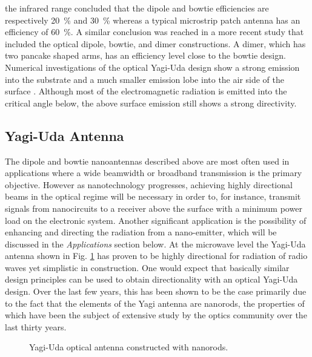 \documentclass[11pt]{article}
\begin{document}
the infrared range \cite{Fischer2008} concluded that the dipole and bowtie efficiencies are respectively \SI{20}{\percent} and \SI{30}{\percent} whereas a typical microstrip patch antenna has an efficiency of \SI{60}{\percent}. A similar conclusion was reached in a more recent study \cite{9781107014145} that included the optical dipole, bowtie, and dimer constructions. A dimer, which has two pancake shaped arms, has an efficiency level close to the bowtie design. Numerical investigations of the optical Yagi-Uda design show a strong emission into the substrate and a much smaller emission lobe into the air side of the surface \cite{Hofmann2007} \cite{Kosako2010}. Although most of the electromagnetic radiation is emitted into the critical angle below, the above surface emission still shows a strong directivity.
\subsection{Yagi-Uda Antenna}
%
The dipole and bowtie nanoantennas described above are most often used in applications where a wide beamwidth or broadband transmission is the primary objective. However as nanotechnology progresses, achieving highly directional beams in the optical regime will be necessary in order to, for instance, transmit signals from nanocircuits to a receiver above the surface with a minimum power load on the electronic system. Another significant application is the possibility of enhancing and directing the radiation from a nano-emitter, which will be discussed in the \emph{Applications} section below. At the microwave level the Yagi-Uda antenna shown in Fig. \ref{fig:yagi_uda} has proven to be highly directional for radiation of radio waves yet simplistic in construction. One would expect that basically similar design principles can be used to obtain directionality with an optical Yagi-Uda design. Over the last few years, this has been shown to be the case primarily due to the fact that the elements of the Yagi antenna are nanorods, the properties of which have been the subject of extensive study by the optics community over the last thirty years.
%
%
\begin{figure}[h!]
  \centering
  \def\svgwidth{.75\linewidth}
  
  \caption{Yagi-Uda optical antenna constructed with nanorods.}
  \label{fig:yagi_uda}
\end{figure}
%
%
\end{document}
